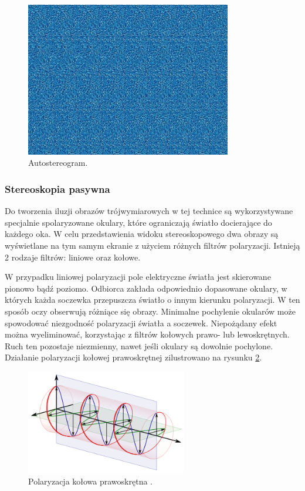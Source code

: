\begin{figure}[H]
		\centering
 		\includegraphics[width=9.0cm]{68.jpg}
    	\caption{Autostereogram\cite{autostereogram}.}
 		\label{rys26}
\end{figure}

\subsubsection{Stereoskopia pasywna} 
Do tworzenia iluzji obrazów trójwymiarowych w tej technice są wykorzystywane specjalnie spolaryzowane okulary, które ograniczają światło docierające do każdego oka. W celu przedstawienia widoku stereoskopowego dwa obrazy są wyświetlane na tym samym ekranie z użyciem różnych filtrów polaryzacji. Istnieją 2 rodzaje filtrów: liniowe oraz kołowe.

W przypadku liniowej polaryzacji pole elektryczne światła jest skierowane pionowo bądź poziomo. Odbiorca zakłada odpowiednio dopasowane okulary, w których każda soczewka przepuszcza światło o innym kierunku polaryzacji. W ten sposób oczy obserwują różniące się obrazy. Minimalne pochylenie okularów może spowodować niezgodność polaryzacji światła a soczewek. Niepożądany efekt można wyeliminować, korzystając z filtrów kołowych prawo- lub lewoskrętnych. Ruch ten pozostaje niezmienny, nawet jeśli okulary są dowolnie pochylone\cite{russianpage}. Działanie polaryzacji kołowej prawoskrętnej zilustrowano na rysunku \ref{rys3}. 

\begin{figure}[H]
		\centering
 		\includegraphics[width=7.0cm]{circular.png}
    	\caption{Polaryzacja kołowa prawoskrętna \cite{polarization}.}
 		\label{rys3}
\end{figure}

